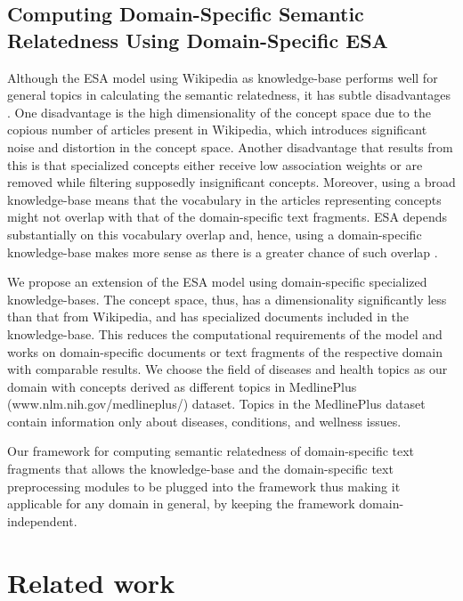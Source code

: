 \documentclass[conference]{IEEEtran}
\begin{document}
\subsection {Computing Domain-Specific Semantic Relatedness Using Domain-Specific ESA}

Although the ESA model using Wikipedia as knowledge-base performs well for general topics in calculating the semantic relatedness, it has subtle disadvantages \cite{insights}. One disadvantage is the high dimensionality of the concept space due to the copious number of articles present in Wikipedia, which introduces significant noise and distortion in the concept space. Another disadvantage that results from this is that specialized concepts either receive low association weights or are removed while filtering supposedly insignificant concepts. Moreover, using a broad knowledge-base means that the vocabulary in the articles representing concepts might not overlap with that of the domain-specific text fragments. ESA depends substantially on this vocabulary overlap and, hence, using a domain-specific knowledge-base makes more sense as there is a greater chance of such overlap \cite{insights}.

We propose an extension of the ESA model using domain-specific specialized knowledge-bases. The concept space, thus, has a dimensionality significantly less than that from Wikipedia, and has specialized documents included in the knowledge-base. This reduces the computational requirements of the model and works on domain-specific documents or text fragments of the respective domain with comparable results. We choose the field of diseases and health topics as our domain with concepts derived as different topics in MedlinePlus (www.nlm.nih.gov/medlineplus/‎) dataset. Topics in the MedlinePlus dataset contain information only about diseases, conditions, and wellness issues.

Our framework for computing semantic relatedness of domain-specific text fragments that allows the knowledge-base and the domain-specific text preprocessing modules to be plugged into the framework thus making it applicable for any domain in general, by keeping the framework domain-independent.

\section{Related work}
\end{document}
